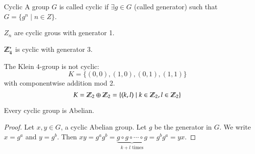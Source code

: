 \begin{defn}{Cyclic}
	A group $G$ is called cyclic if $\exists g\in G$ (called generator) such that $G = \{g^n\mid n\in Z\}$. 
\end{defn}
\example
$Z_n$ are cyclic grous with generator 1. 

$\mathbb{Z}_4^*$ is cyclic with generator $3$. 

\example The Klein $4$-group is not cyclic: 
\[K = \{(0,0), (1,0), (0,1), (1,1)\}\]
with componentwise addition mod $2$. 
\[K = \mathbb{Z}_2\oplus \mathbb{Z}_2 = \{(k,l)\mid k\in \mathbb{Z}_2, l\in \mathbb{Z}_2\}\]

\begin{proposition}
Every cyclic group is Abelian. 	
\end{proposition}
\begin{proof}
Let $x, y\in G$, a cyclic Abelian group. Let $g$ be the generator in $G$. We write $x = g^a$ and $y = g^b$. Then $\displaystyle xy = g^ag^b = \underbrace{g\circ g\circ \cdots \circ g}_{\text{$k+l$ times}} = g^bg^a = yx$. 
\end{proof}

